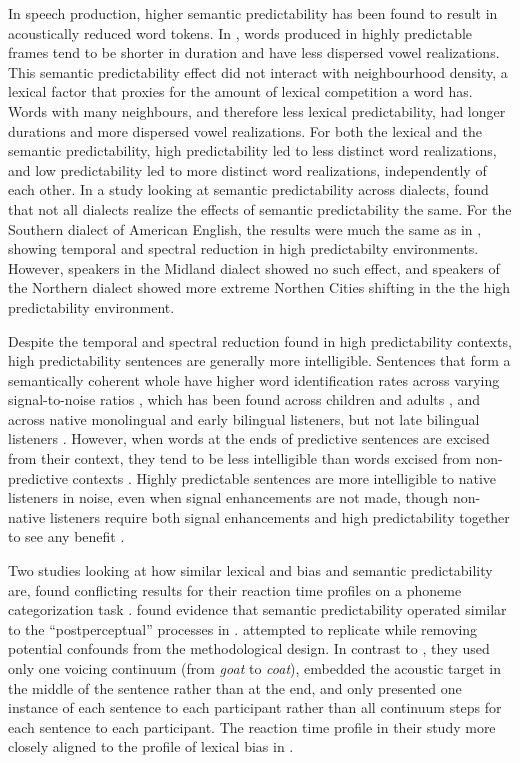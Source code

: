 In speech production, higher semantic predictability has been found to result in acoustically reduced word tokens.  
In \citet{Scarborough2010}, words produced in highly predictable frames tend to be shorter in duration and have less dispersed vowel realizations.  
This semantic predictability effect did not interact with neighbourhood density, a lexical factor that proxies for the amount of lexical competition a word has.  
Words with many neighbours, and therefore less lexical predictability, had longer durations and more dispersed vowel realizations.  
For both the lexical and the semantic predictability, high predictability led to less distinct word realizations, and low predictability led to more distinct word realizations, independently of each other.
In a study looking at semantic predictability across dialects, \citet{Clopper2008} found that not all dialects realize the effects of semantic predictability the same.  
For the Southern dialect of American English, the results were much the same as in \citet{Scarborough2010}, showing temporal and spectral reduction in high predictabilty environments.  
However, speakers in the Midland dialect showed no such effect, and speakers of the Northern dialect showed more extreme Northen Cities shifting in the the high predictability environment.

Despite the temporal and spectral reduction found in high predictability contexts, high predictability sentences are generally more intelligible.
Sentences that form a semantically coherent whole have higher word identification rates across varying signal-to-noise ratios \citep{Kalikow1977}, which has been found across children and adults \citep{Fallon2002}, and across native monolingual and early bilingual listeners, but not late bilingual listeners \citep{Mayo1997}.
However, when words at the ends of predictive sentences are excised from their context, they tend to be less intelligible than words excised from non-predictive contexts \citep{Lieberman1963}.
Highly predictable sentences are more intelligible to native listeners in noise, even when signal enhancements are not made, though non-native listeners require both signal enhancements and high predictability together to see any benefit \cite{Bradlow2007}.

Two studies looking at how similar lexical and bias and semantic predictability are, found conflicting results for their reaction time profiles on a phoneme categorization task \citep{Connine1987,Borsky1998}.
\citet{Connine1987} found evidence that semantic predictability operated similar to the ``postperceptual'' processes in \citet{Connine1987a}.  \citet{Borsky1998} attempted to replicate \citet{Connine1987} while removing potential confounds from the methodological design.  In contrast to \citet{Connine1987}, they used only one voicing continuum (from \emph{goat} to \emph{coat}), embedded the acoustic target in the middle of the sentence rather than at the end, and only presented one instance of each sentence to each participant rather than all continuum steps for each sentence to each participant.  The reaction time profile in their study more closely aligned to the profile of lexical bias in \citet{Connine1987a}.

